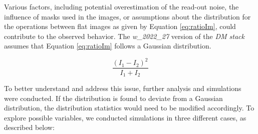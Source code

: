 \vspace{3mm}

Various factors, including potential overestimation of the read-out noise, the influence of masks used in the images, or assumptions about the distribution for the operations between flat images as given by Equation \ref{eq:ratioIm}, could contribute to the observed behavior. The \textit{w\_2022\_27} version of the \textit{DM stack} assumes that Equation \ref{eq:ratioIm} follows a Gaussian distribution.

\begin{equation}
      \frac{(I_1 - I_2)^2}{I_1 + I_2} 
      \label{eq:ratioIm}
\end{equation}

To better understand and address this issue, further analysis and simulations were conducted. If the distribution is found to deviate from a Gaussian distribution, the distribution statistics would need to be modified accordingly. To explore possible variables, we conducted simulations in three different cases, as described below:


